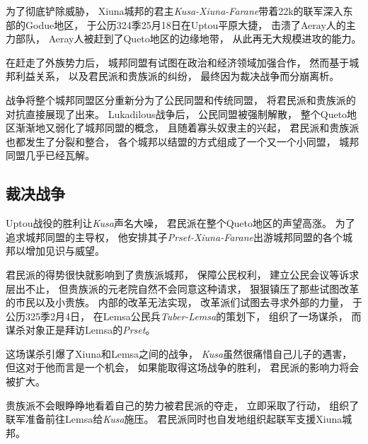 \documentclass[UTF8,12pt,draft]{ctexbook}
\begin{document}
                为了彻底铲除威胁，
                Xiuna城邦的君主\emph{Kusa-Xiuna-Farane}带着22k的联军深入东部的Godue地区，
                于公历324季25月18日在Uptou平原大捷，
                击溃了Aeray人的主力部队，
                Aeray人被赶到了Queto地区的边缘地带，
                从此再无大规模进攻的能力。
                
                在赶走了外族势力后，
                城邦同盟有试图在政治和经济领域加强合作，
                然而基于城邦利益关系，
                以及君民派和贵族派的纠纷，
                最终因为裁决战争而分崩离析。

                战争将整个城邦同盟区分重新分为了公民同盟和传统同盟，
                将君民派和贵族派的对抗直接展现了出来。
                Lukadilous战争后，
                公民同盟被强制解散，
                整个Queto地区渐渐地又弱化了城邦同盟的概念，
                且随着寡头奴隶主的兴起，
                君民派和贵族派也都发生了分裂和整合，
                各个城邦以结盟的方式组成了一个又一个小同盟，
                城邦同盟几乎已经瓦解。
            \subsection{裁决战争}
                Uptou战役的胜利让\emph{Kusa}声名大噪，
                君民派在整个Queto地区的声望高涨。
                为了追求城邦同盟的主导权，
                他安排其子\emph{Prset-Xiuna-Farane}出游城邦同盟的各个城邦以增加见识与威望。

                君民派的得势很快就影响到了贵族派城邦，
                保障公民权利，
                建立公民会议等诉求层出不止，
                但贵族派的元老院自然不会同意这种请求，
                狠狠镇压了那些试图改革的市民以及小贵族。
                内部的改革无法实现，
                改革派们试图去寻求外部的力量，
                于公历325季2月4日，
                在Lemsa公民兵\emph{Tuber-Lemsa}的策划下，
                组织了一场谋杀，
                而谋杀对象正是拜访Lemsa的\emph{Prset}。

                这场谋杀引爆了Xiuna和Lemsa之间的战争，
                \emph{Kusa}虽然很痛惜自己儿子的遇害，
                但这对于他而言是一个机会，
                如果能取得这场战争的胜利，
                君民派的影响力将会被扩大。

                贵族派不会眼睁睁地看着自己的势力被君民派的夺走，
                立即采取了行动，
                组织了联军准备前往Lemsa给\emph{Kusa}施压。
                君民派同时也自发地组织起联军支援Xiuna城邦。
\end{document}
